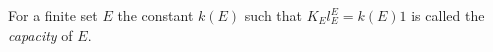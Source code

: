 For a finite set $E$ the constant $k(E)$ such that $K_E l_E^E = k(E) 1$ is called the \emph{capacity} of $E$.
